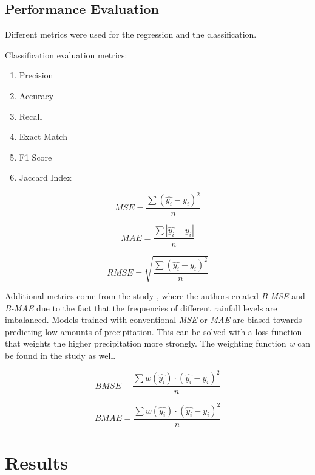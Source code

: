 \documentclass[acmtog, authorversion]{acmart}
\begin{document}
\subsection{Performance Evaluation}

Different metrics were used for the regression and the classification.

Classification evaluation metrics:
\begin{enumerate}
  \item Precision
  \item Accuracy
  \item Recall
  \item Exact Match
  \item F1 Score
  \item Jaccard Index
\end{enumerate}

\begin{equation}
  MSE = \frac{\sum (\hat{y_i} -y_i)^2}{n}
\end{equation}

\begin{equation}
MAE = \frac{\sum |\hat{y_i} -y_i|}{n}
\end{equation}

\begin{equation}
RMSE = \sqrt{\frac{\sum (\hat{y_i} -y_i)^2}{n}}
\end{equation}

Additional metrics come from the study \cite{shi2017deep}, where the authors created \textit{B-MSE} and \textit{B-MAE} due to the fact that the frequencies of different rainfall levels are imbalanced. Models trained with conventional \textit{MSE} or \textit{MAE} are biased towards predicting low amounts of precipitation. This can be solved with a loss function that weights the higher precipitation more strongly. The weighting function \textit{w} can be found in the study as well.

\begin{equation}
BMSE = \frac{\sum w(\hat{y_i}) \cdot (\hat{y_i} -y_i)^2}{n}
\end{equation}

\begin{equation}
BMAE = \frac{\sum w(\hat{y_i})  \cdot (\hat{y_i} -y_i)^2}{n}
\end{equation}


\section{Results}
\end{document}
